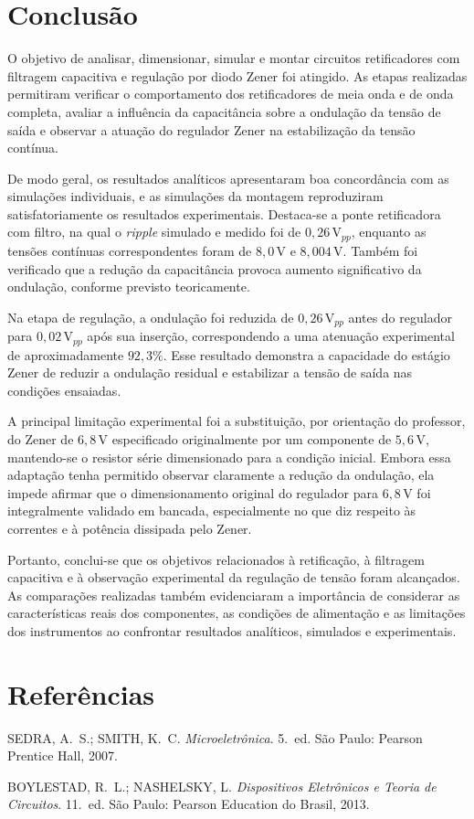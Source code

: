 \documentclass[11pt,a4paper]{article}
\begin{document}
\section{Conclusão}
\label{sec:conclusao}

O objetivo de analisar, dimensionar, simular e montar circuitos retificadores com filtragem capacitiva e regulação por diodo Zener foi atingido. As etapas realizadas permitiram verificar o comportamento dos retificadores de meia onda e de onda completa, avaliar a influência da capacitância sobre a ondulação da tensão de saída e observar a atuação do regulador Zener na estabilização da tensão contínua.

De modo geral, os resultados analíticos apresentaram boa concordância com as simulações individuais, e as simulações da montagem reproduziram satisfatoriamente os resultados experimentais. Destaca-se a ponte retificadora com filtro, na qual o \textit{ripple} simulado e medido foi de $0{,}26\,\text{V}_{pp}$, enquanto as tensões contínuas correspondentes foram de $8{,}0\,\text{V}$ e $8{,}004\,\text{V}$. Também foi verificado que a redução da capacitância provoca aumento significativo da ondulação, conforme previsto teoricamente.

Na etapa de regulação, a ondulação foi reduzida de $0{,}26\,\text{V}_{pp}$ antes do regulador para $0{,}02\,\text{V}_{pp}$ após sua inserção, correspondendo a uma atenuação experimental de aproximadamente $92{,}3\%$. Esse resultado demonstra a capacidade do estágio Zener de reduzir a ondulação residual e estabilizar a tensão de saída nas condições ensaiadas.

A principal limitação experimental foi a substituição, por orientação do professor, do Zener de $6{,}8\,\text{V}$ especificado originalmente por um componente de $5{,}6\,\text{V}$, mantendo-se o resistor série dimensionado para a condição inicial. Embora essa adaptação tenha permitido observar claramente a redução da ondulação, ela impede afirmar que o dimensionamento original do regulador para $6{,}8\,\text{V}$ foi integralmente validado em bancada, especialmente no que diz respeito às correntes e à potência dissipada pelo Zener.

Portanto, conclui-se que os objetivos relacionados à retificação, à filtragem capacitiva e à observação experimental da regulação de tensão foram alcançados. As comparações realizadas também evidenciaram a importância de considerar as características reais dos componentes, as condições de alimentação e as limitações dos instrumentos ao confrontar resultados analíticos, simulados e experimentais.

\section{Referências}

\begin{referencias}
\item SEDRA, A.~S.; SMITH, K.~C. \emph{Microeletrônica}. 5.~ed. São Paulo: Pearson
      Prentice Hall, 2007.
\item BOYLESTAD, R.~L.; NASHELSKY, L. \emph{Dispositivos Eletrônicos e Teoria de
      Circuitos}. 11.~ed. São Paulo: Pearson Education do Brasil, 2013.
\end{referencias}
\end{document}
